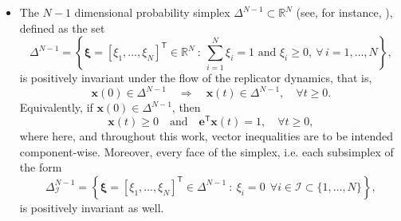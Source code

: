 \documentclass[11pt,letterpaper]{article}
\theoremstyle{remark}
\begin{document}
\begin{itemize}
    \item The $N-1$ dimensional probability simplex $\Delta^{N-1}\subset \mathbb{R}^N$ (see, for instance, \cite[Section 2.2.4]{boyd2004convex}), defined as the set 
    \begin{equation}\label{eq:simplex_def}
        \Delta^{N-1} = \left\{\bm{\xi}=[\xi_1,\dots,\xi_N]^\mathsf{T}\in\mathbb{R}^N \ :  \ \sum_{i=1}^{N}\xi_i = 1 \text{ and } \xi_i\ge 0, \ \forall \, i=1,\dots,N \right\},
    \end{equation}
    is positively invariant under the flow of the replicator dynamics, that is,\begin{equation}\label{eq:Simplex_Invariant}
        \bm{x}(0) \in \Delta^{N-1} \quad \Longrightarrow \quad \bm{x}(t) \in \Delta^{N-1}, \quad \forall t \geq 0.
    \end{equation}
    Equivalently, if $\bm{x}(0) \in \Delta^{N-1}$, then
    \begin{equation}\label{eq:Simplex_Invariant_COMPONENT} 
        \bm{x}(t) \geq 0 \quad \text{and} \quad \bm{e}^{\mathsf{T}} \bm{x}(t) = 1, \quad \forall t \geq 0,
    \end{equation}
    where here, and throughout this work, vector inequalities are to be intended component-wise. Moreover, every face of the simplex, i.e. each subsimplex of the form
    \begin{equation}\label{eq:Faces_simplices}
        \Delta_{\mathcal{I}}^{N-1} = \left\{\bm{\xi} = [\xi_1,\dots,\xi_N]^\mathsf{T} \in \Delta^{N-1} \ : \ \xi_i = 0 \ \ \forall i \in \mathcal{I} \subset \{1,\dots,N\} \right\},
    \end{equation}
    is positively invariant as well.
    

\end{itemize}
\end{document}
